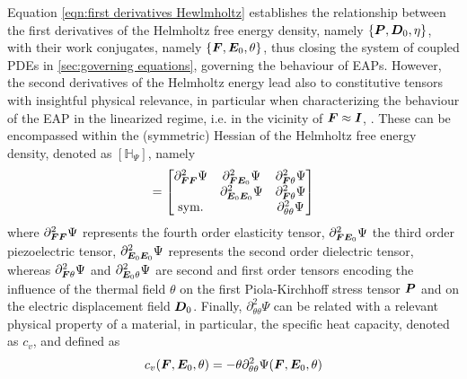 Equation \eqref{eqn:first derivatives Hewlmholtz} establishes the relationship between the first derivatives of the Helmholtz free energy density, namely $\{\boldsymbol{P},\boldsymbol{D}_0,\eta\}$, with their work conjugates, namely $\{\boldsymbol{F},\boldsymbol{E}_0,\theta\}$, thus closing the system of coupled PDEs in \eqref{sec:governing equations}, governing the behaviour of EAPs. However, the second derivatives of the Helmholtz energy lead also to constitutive tensors with insightful physical relevance, in particular when characterizing the behaviour of the EAP in the linearized regime, i.e. in the vicinity of $\boldsymbol{F}\approx \boldsymbol{I}$, . These can be encompassed within the (symmetric) Hessian of the Helmholtz free energy density, denoted as $[\mathbb{H}_{\Psi}]$, namely
%
\begin{equation}
[\mathbb{H}_{\Psi}]=\begin{bmatrix}
\partial^2_{\vect{F}\vect{F}}\Psi  &  \partial^2_{\vect{F}\vect{E}_0}\Psi  &  \partial^2_{\vect{F}\theta}\Psi\\
%
  &  \partial^2_{\vect{E}_0\vect{E}_0}\Psi  &  \partial^2_{\vect{F}\theta}\Psi\\
%
\text{sym.}  &    &  \partial^2_{\theta\theta}\Psi
\end{bmatrix}
\end{equation}
%
where $\partial^2_{\boldsymbol{F}\boldsymbol{F}}\Psi$ represents the fourth order elasticity tensor, $\partial^2_{\boldsymbol{F}\boldsymbol{E}_0}\Psi$ the third order piezoelectric tensor, $\partial^2_{\boldsymbol{E}_0\boldsymbol{E}_0}\Psi$ represents the second order dielectric tensor, whereas $\partial^2_{\boldsymbol{F}\theta}\Psi$ and $\partial^2_{\boldsymbol{E}_0\theta}\Psi$ are second and first order tensors encoding the influence of the thermal field $\theta$ on the first Piola-Kirchhoff stress tensor $\boldsymbol{P}$ and on the electric displacement field $\boldsymbol{D}_0$. Finally, $\partial^2_{\theta\theta}\Psi$ can be related with a relevant physical property of a material, in particular, the specific heat capacity, denoted as $c_v$, and defined as \cite{Vertechhy}
%
\begin{equation}\label{eqn:heat capacity}
c_v(\boldsymbol{F},\boldsymbol{E}_0,\theta) = -\theta \partial^2_{\theta\theta}\Psi(\boldsymbol{F},\boldsymbol{E}_0,\theta)
\end{equation}

